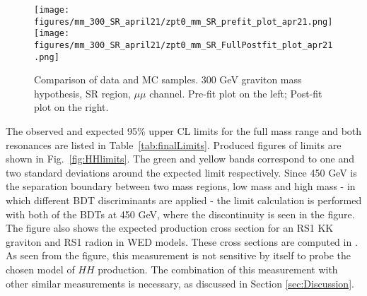 \begin{figure}[H]
\begin{center}
\texttt{[image: figures/mm\_300\_SR\_april21/zpt0\_mm\_SR\_prefit\_plot\_apr21.png]}
\texttt{[image: figures/mm\_300\_SR\_april21/zpt0\_mm\_SR\_FullPostfit\_plot\_apr21.png]}\\
\caption[Data-MC comparison in the SR.]{Comparison of data and MC samples. 300 GeV graviton mass hypothesis, SR region, $\mu\mu$ channel. Pre-fit plot on the left; Post-fit plot on the right.}
\label{MCcomparisons_mm_low_SR_5}
\end{center}
\end{figure}


The observed and expected 95\% upper CL limits for the full mass range and both resonances are listed in Table~\ref{tab:finalLimits}. Produced figures of limits are shown in Fig.~\ref{fig:HHlimits}. The green and yellow bands correspond to one and two standard deviations around the expected limit respectively. Since 450 GeV is the separation boundary between two mass regions, low mass and high mass - in which different BDT discriminants are applied - the limit calculation is performed with both of the BDTs at 450 GeV, where the discontinuity is
seen in the figure. The figure also shows the expected production cross section for an RS1 KK graviton and RS1 radion in WED models. These cross sections are computed in \cite{Oliveira:2014kla}. As seen from the figure, this measurement is not sensitive by itself to probe the chosen model of $HH$ production. The combination of this measurement with other similar measurements is necessary, as discussed in Section \ref{sec:Discussion}.

